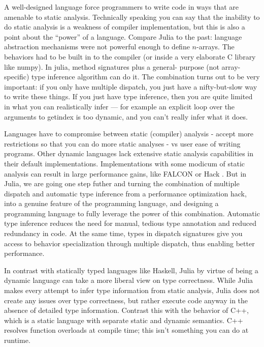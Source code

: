 \documentclass[preprint]{sigplanconf}
\begin{document}
A well-designed language force programmers to write code in ways that are
amenable to static analysis. Technically speaking you can say that the
inability to do static analysis is a weakness of compiler implementation, but
this is also a point about the ``power'' of a language. Compare Julia to the
past: language abstraction mechanisms were not powerful enough to define
$n$-arrays. The behaviors had to be built in to the compiler (or inside a very
elaborate C library like numpy). In julia, method signatures plus a general-
purpose (not array-specific) type inference algorithm can do it. The
combination turns out to be very important: if you only have multiple
dispatch, you just have a nifty-but-slow way to write these things. If you
just have type inference, then you are quite limited in what you can
realistically infer --- for example an explicit loop over the arguments to
getindex is too dynamic, and you can't really infer what it does.

Languages have to compromise between static (compiler) analysis - accept more
restrictions so that you can do more static analyses - vs user ease of writing
programs. Other dynamic languages lack extensive static analysis capabilities
in their default implementations. Implementations with some modicum of static
analysis can result in large performance gains, like FALCON or Hack
\cite{Verlaguet:2014hn}. But in Julia, we are going one step futher and
turning the combination of multiple dispatch and automatic type inference from
a performance optimization hack, into a genuine feature of the programming
language, and designing a programming language to fully leverage the power of
this combination. Automatic type inference reduces the need for manual,
tedious type annotation and reduced redundancy in code. At the same time,
types in dispatch signatures give you access to behavior specialization through
multiple dispatch, thus enabling better performance. 

In contrast with statically typed languages like Haskell, Julia by virtue of
being a dynamic language can take a more liberal view on type correctness.
While Julia makes every attempt to infer type information from static
analysis, Julia does not create any issues over type correctness, but rather
execute code anyway in the absence of detailed type information. Contrast this
with the behavior of C++, which is a static language with separate static and
dynamic semantics. C++ resolves function overloads at compile time; this isn't
something you can do at runtime.
\end{document}
